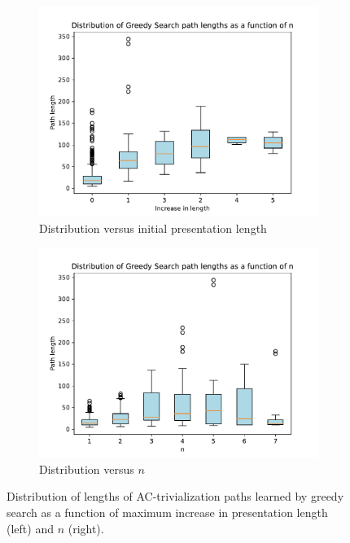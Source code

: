 \begin{figure}
	\centering
	\begin{subfigure}[b]{0.4\textwidth}
		\includegraphics[width=\textwidth]{fig/path_lengths_vs_length_increase.pdf}
		\caption{Distribution versus initial presentation length}
		\label{fig:path_lengths_vs_length_increase}
	\end{subfigure}
	\begin{subfigure}[b]{0.4\textwidth}
		\centering
		\includegraphics[width=1.1\textwidth]{fig/gs_path_lengths.pdf}
		\caption{Distribution versus $n$}
		\label{fig:gs_path_lengths}
	\end{subfigure}%
	\caption{Distribution of lengths of AC-trivialization paths learned by greedy search as a function of maximum increase in presentation length (left) and $n$ (right).} \label{fig:gs_path_length}
\end{figure}

